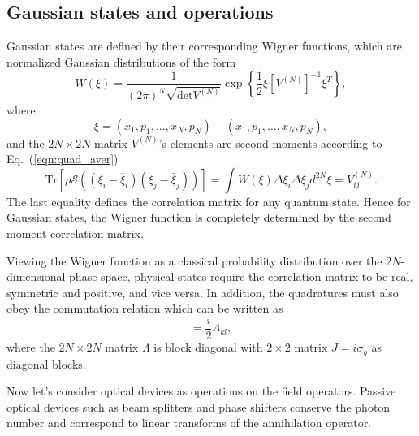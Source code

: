\documentclass[%
 reprint,
groupedaddress,
showpacs,
 amsmath,amssymb,
 aps,
prb,
]{revtex4-1}
\begin{document}



	\subsection{Gaussian states and operations} %
	\label{sub:gaussian_states_and_operations}

		Gaussian states are defined by their corresponding Wigner functions, which are normalized Gaussian distributions of the form
		\begin{equation}
		W(\xi) = \frac{1}{ (2\pi)^N \sqrt{ \mathrm{det} V^{(N)} } } \exp \left\{ \frac{1}{2} \xi [V^{(N)}]^{-1} \xi^T \right\},
		\end{equation}
		where
		\begin{equation}
		\xi = (x_1,p_1,...,x_N,p_N) - (\bar x_1,\bar p_1,...,\bar x_N,\bar p_N),
		\end{equation}
		and the $2N\times 2N$ matrix $ V^{(N)} $'s elements are second moments according to Eq.~(\ref{eqn:quad_aver})
		\begin{equation}
		\mathrm{Tr} [ \rho \mathcal S ((\xi_i - \bar \xi_i)(\xi_j - \bar \xi_j) ) ] = \int W(\xi)\Delta\xi_i \Delta\xi_j d^{2N}\xi = V_{ij}^{(N)}.
		\end{equation}
		The last equality defines the correlation matrix for any quantum state. Hence for Gaussian states, the Wigner function is completely determined by the second moment correlation matrix.
		
		Viewing the Wigner function as a classical probability distribution over the $2N$-dimensional phase space, physical states require the correlation matrix to be real, symmetric and positive, and vice versa. In addition, the quadratures must also obey the commutation relation which can be written as
		\begin{equation}
		[\xi_k, \xi_l] = \frac{i}{2} \Lambda_{kl},
		\end{equation}
		where the $2N\times 2N$ matrix $ \Lambda $ is block diagonal with $2\times 2$ matrix $J = i \sigma_y $ as diagonal blocks.

		Now let's consider optical devices as operations on the field operators. Passive optical devices such as beam splitters and phase shifters conserve the photon number and correspond to linear transforms of the annihilation operator.
\end{document}

